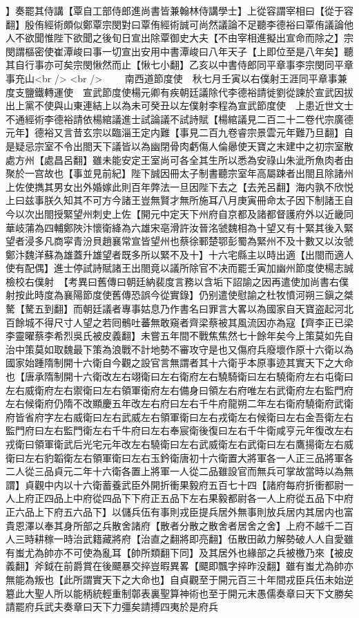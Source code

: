 】奏罷其侍講【覃自工部侍郎進尚書皆兼翰林侍講學士】上從容謂宰相曰【從于容翻】殷侑經術頗似鄭覃宗閔對曰覃侑經術誠可尚然議論不足聽李德裕曰覃侑議論他人不欲聞惟陛下欲聞之後旬日宣出除覃御史大夫【不由宰相進擬出宣命而除之】宗閔謂樞密使崔潭峻曰事一切宣出安用中書潭峻曰八年天子【上即位至是八年矣】聽其自行事亦可矣宗閔愀然而止【愀七小翻】乙亥以中書侍郎同平章事李宗閔同平章事充山<br />
<br />
　　南西道節度使　秋七月壬寅以右僕射王涯同平章事兼度支鹽鐵轉運使　宣武節度使楊元卿有疾朝廷議除代李德裕請徙劉從諫於宣武因拔出上黨不使與山東連結上以為未可癸丑以左僕射李程為宣武節度使　上患近世文士不通經術李德裕請依楊綰議進士試論議不試詩賦【楊綰議見二百二十二卷代宗廣德元年】德裕又言昔玄宗以臨淄王定内難【事見二百九卷睿宗景雲元年難乃旦翻】自是疑忌宗室不令出閤天下議皆以為幽閉骨肉虧傷人倫曏使天寶之末建中之初宗室散處方州【處昌呂翻】雖未能安定王室尚可各全其生所以悉為安祿山朱泚所魚肉者由聚於一宫故也【事並見前紀】陛下誠因冊太子制書聽宗室年高屬踈者出閤且除諸州上佐使擕其男女出外婚嫁此則百年弊法一旦因陛下去之【去羌呂翻】海内孰不欣悦上曰兹事朕久知其不可方今諸王豈無賢才無所施耳八月庚寅冊命太子因下制諸王自今以次出閤授緊望州刺史上佐【開元中定天下州府自京都及諸都督護府外以近畿同華岐蒲為四輔鄭陜汴懷衛絳為六雄宋亳滑許汝晉洺虢魏相為十望又有十緊其後入緊望者浸多凡商寜青汾貝趙襄常宣皆望州也蔡徐鄆楚鄂彭蜀為緊州不及十數又以汝虢鄭汴魏洋蘇為雄蓋升雄望者既多所以緊不及十】十六宅縣主以時出適【出閤而適人使有配偶】進士停試詩賦諸王出閤竟以議所除官不决而罷壬寅加幽州節度使楊志誠檢校右僕射　【考異曰舊傳曰朝廷納裴度言務以含垢下詔諭之因再遣使加尚書右僕射按此時度為襄陽節度使舊傳恐誤今從實錄】仍别遣使慰諭之杜牧憤河朔三鎭之桀驁【驁五到翻】而朝廷議者專事姑息乃作書名曰罪言大畧以為國家自天寶盗起河北百餘城不得尺寸人望之若囘鶻吐蕃無敢窺者齊梁蔡被其風流因亦為寇【齊李正已梁李靈曜蔡李希烈吳氏被皮義翻】未嘗五年間不戰焦焦然七十餘年矣今上策莫如先自治中策莫如取魏最下策為浪戰不計地勢不審攻守是也又傷府兵廢壞作原十六衛以為國家始踵隋制開十六衛自今觀之設官言無謂者其十六衛乎本原事迹其實天下之大命也【唐承隋制開十六衛改左右翊衛曰左右衛府左右驍騎衛曰左右驍衛府左右屯衛曰左右威衛府左右禦衛曰左右領軍衛府左右備身曰領左右府唯左右武衛府左右監門府左右候衛府仍隋不改顯慶五年改左右府曰左右千牛府龍朔二年左右衛府驍衛府武衛府皆省府字左右威衛曰左右武威左右領軍衛曰左右戎衛左右候衛曰左右金吾衛左右監門府曰左右監門衛左右千牛府曰左右奉宸衛後復曰左右千牛衛咸亨元年復改左右戎衛曰領軍衛武后光宅元年改左右驍衛曰左右武威衛左右武衛曰左右鷹揚衛左右威衛曰左右豹韜衛左右領軍衛曰左右玉鈐衛唐初十六衛置大將軍各一人正三品將軍各二人從三品貞元二年十六衛各置上將軍一人從二品雖設官而無兵可掌故當時以為無謂】貞觀中内以十六衛蓄養武臣外開折衝果毅府五百七十四【諸府每府折衝都尉一人上府正四品上中府從四品下下府正五品下左右果毅都尉各一人上府從五品下中府正六品上下府五六品下】以儲兵伍有事則戎臣提兵居外無事則放兵居内其居内也富貴恩澤以奉其身所部之兵散舍諸府【散者分散之散舍者居舍之舍】上府不越千二百人三時耕稼一時治武籍藏將府【治直之翻將即亮翻】伍散田畝力解勢破人人自愛雖有蚩尤為帥亦不可使為亂耳【帥所類翻下同】及其居外也緣部之兵被檄乃來【被皮義翻】斧鉞在前爵賞在後飃暴交捽豈暇異畧【飃即飄字捽昨没翻】雖有蚩尤為帥亦無能為叛也【此所謂實天下之大命也】自貞觀至于開元百三十年間戎臣兵伍未始逆簒此大聖人所以能柄統輕重制鄣表裏聖算神術也至于開元末愚儒奏章曰天下文勝矣請罷府兵武夫奏章曰天下力彊矣請搏四夷於是府兵